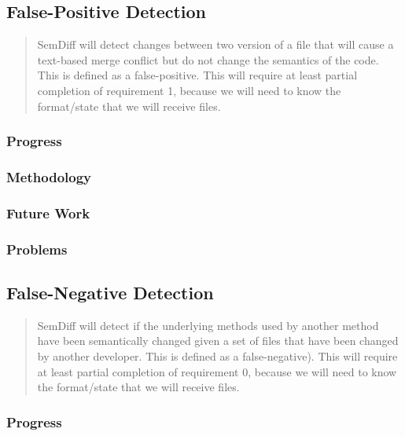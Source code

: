 \documentclass[draftclsnofoot,onecolumn]{IEEEtran}
\begin{document}
\subsection{False-Positive Detection}

\begin{quote}

SemDiff will detect changes between two version of a file that will cause a text-based merge conflict but do not change the semantics of the code. This is defined as a false-positive. This will require at least partial completion of requirement 1, because we will need to know the format/state that we will receive files.

\end{quote}

\subsubsection{Progress}

\subsubsection{Methodology}

\subsubsection{Future Work}

\subsubsection{Problems}






\subsection{False-Negative Detection}

\begin{quote}

SemDiff will detect if the underlying methods used by another method have been semantically changed given a set of files that have been changed by another developer. This is defined as a false-negative). This will require at least partial completion of requirement 0, because we will need to know the format/state that we will receive files.

\end{quote}

\subsubsection{Progress}
\end{document}
